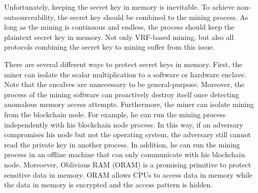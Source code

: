 Unfortunately, keeping the secret key in memory is inevitable. To achieve non-outsourceability, the secret key should be combined to the mining process. As long as the mining is continuous and endless, the process should keep the plaintext secret key in memory. Not only VRF-based mining, but also all protocols combining the secret key to mining suffer from this issue.

There are several different ways to protect secret keys in memory.
First, the miner can isolate the scalar multiplication to a software or hardware enclave. Note that the encalves are unnecessary to be general-purpose. Moreover, the process of the mining software can proactively destroy itself once detecting anomalous memory access attempts.
Furthermore, the miner can isolate mining from the blockchain node.
For example, he can run the mining process independently with his blockchain node process.
In this way, if an adversary compromises his node but not the operating system, the adversary still cannot read the private key in another process.
In addition, he can run the mining process in an offline machine that can only communicate with his blockchain node.
Moreoever, Oblivious RAM (ORAM) is a promising primitive to protect sensitive data in memory.
ORAM allows CPUs to access data in memory while the data in memory is encrypted and the access pattern is hidden.